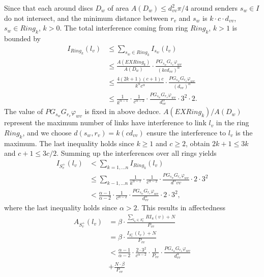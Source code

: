 \documentclass[conference]{IEEEtran}
\begin{document}
Since that each around discs $D_w$ of area $A(D_w) \leq d^2_{vv}\pi/4$ around senders $s_w \in I$ do not intersect, and the minimum distance between $r_v$ and $s_w$ is $k \cdot c \cdot d_{vv}$, $s_w \in Ring_k$, $k>0$. The total interference coming from ring $Ring_k$, $k>1$ is bounded by
\begin{equation*}
\begin{split}
I_{Ring_k}(l_v)&\leq \sum_{s_w \in Ring_k} I_{s_w}(l_v)\\
&\leq \frac{A(EXRing_k)}{A(D_w)}\cdot \frac{PG_{s_w}G_{r_v}\varphi_{wv}}{(kcd_{vv})^{\alpha}}\\
&\leq \frac{4(2k+1)(c+1)c}{k^{\alpha}c^{\alpha}}
\cdot \frac{PG_{s_w}G_{r_v}\varphi_{wv}}{(d_{vv})^{\alpha}}\\
&\leq \frac{1}{k^{\alpha -1}} \cdot \frac{1}{c^{\alpha-2}}
\cdot \frac{PG_{s_w}G_{r_v} \varphi_{wv} }{d^{\alpha}_{vv}} \cdot  3^2 \cdot 2.
\end{split}
\end{equation*}
The value of $PG_{s_w}G_{r_v}\varphi_{wv}$ is fixed in above deduce. $A(EXRing_k)/A (D_w)$ represent the maximum number of links have interference to link $l_v$ in the ring $Ring_k$, and we choose $d(s_w,r_v) =k(cd_{vv})$ ensure the interference to $l_v$ is the maximum. The last inequality holds since $k \geq 1$ and $c \geq 2$, obtain $2k+1 \leq 3k$ and $c+1 \leq 3c/2$. Summing up the interferences over all rings yields
\begin{equation*}
\begin{split}
  I_{S^+_v}(l_v)& < \sum_{k=1,...n} I_{Ring_k}(l_v)\\
  &\leq \sum_{k-1,...n} \frac{1}{k^{\alpha -1}} \cdot \frac{1}{c^{\alpha-2}} \cdot \frac{PG_{s_w}G_{r_v}\varphi_{wv}}{d^{\alpha}{vv}} \cdot 2\cdot3^2  \\
  &<\frac{\alpha -1}{\alpha-2} \cdot \frac{1}{c^{\alpha-2}} \cdot \frac{PG_{s_w}G_{r_v} \varphi_{wv}}{d^{\alpha}_{vv}} \cdot 2 \cdot 3^2,
\end{split}
\end{equation*}
where the last inequality holds since $\alpha >2$. This results in affectedness
\begin{equation*}
\begin{split}
  A_{S^+_v}(l_v) & =\beta \cdot \frac{\sum_{l_u \in S^+_v}RI_u(v)+N}{P_{vv}}\\
 & =\beta \cdot \frac{I_{S^+_v}(l_v)+N}{P_{vv}}\\
 & <\frac{\alpha-1}{\alpha-2} \cdot \frac{2 \cdot 3^2}{c^{\alpha-2}} \cdot \frac{1}{P_{vv}} \cdot \frac{PG_{s_w}G_{r_v} \varphi_{wv}}{d^{\alpha}_{vv}}\\ &+\frac{N \cdot \beta}{P_{vv}}\\
  \end{split}
\end{equation*}
\end{document}
